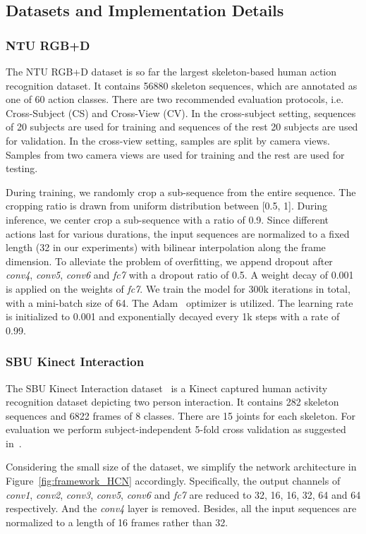 \documentclass{article}
\begin{document}
\subsection{Datasets and Implementation Details}
\subsubsection{NTU RGB+D}

The NTU RGB+D dataset is so far the largest skeleton-based human action recognition dataset. It contains 56880 skeleton sequences, which are annotated as one of 60 action classes. There are two recommended evaluation protocols, i.e. Cross-Subject (CS) and Cross-View (CV). In the cross-subject setting, sequences of 20 subjects are used for training and sequences of the rest 20 subjects are used for validation. In the cross-view setting, samples are split by camera views. Samples from two camera views are used for training and the rest are used for testing.

During training, we randomly crop a sub-sequence from the entire sequence. The cropping ratio is drawn from uniform distribution between [0.5, 1]. During inference, we center crop a sub-sequence with a ratio of 0.9. Since different actions last for various durations, the input sequences are normalized to a fixed length (32 in our experiments) with bilinear interpolation along the frame dimension. To alleviate the problem of overfitting, we append dropout after \emph{conv4}, \emph{conv5}, \emph{conv6} and \emph{fc7} with a dropout ratio of 0.5. A weight decay of 0.001 is applied on the weights of \emph{fc7}. We train the model for 300k iterations in total, with a mini-batch size of 64. The Adam~\cite{kingma2015adam} optimizer is utilized. The learning rate is initialized to 0.001 and exponentially decayed every 1k steps with a rate of 0.99.

\subsubsection{SBU Kinect Interaction}
The SBU Kinect Interaction dataset~\cite{SBU} is a Kinect captured human activity recognition dataset depicting two person interaction. It contains 282 skeleton sequences and 6822 frames of 8 classes. There are 15 joints for each skeleton. For evaluation we perform subject-independent 5-fold cross validation as suggested in~\cite{SBU}.

Considering the small size of the dataset, we simplify the network architecture in Figure~\ref{fig:framework_HCN} accordingly. Specifically, the output channels of \emph{conv1}, \emph{conv2}, \emph{conv3}, \emph{conv5}, \emph{conv6} and \emph{fc7} are reduced to 32, 16, 16, 32, 64 and 64 respectively. And the \emph{conv4} layer is removed. Besides, all the input sequences are normalized to a length of 16 frames rather than 32.
\end{document}
